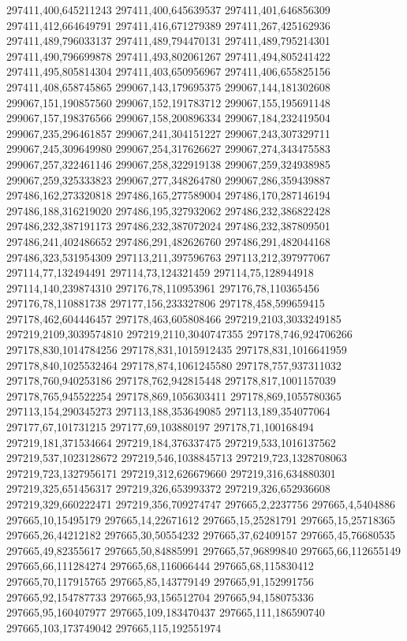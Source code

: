297411,400,645211243
297411,400,645639537
297411,401,646856309
297411,412,664649791
297411,416,671279389
297411,267,425162936
297411,489,796033137
297411,489,794470131
297411,489,795214301
297411,490,796699878
297411,493,802061267
297411,494,805241422
297411,495,805814304
297411,403,650956967
297411,406,655825156
297411,408,658745865
299067,143,179695375
299067,144,181302608
299067,151,190857560
299067,152,191783712
299067,155,195691148
299067,157,198376566
299067,158,200896334
299067,184,232419504
299067,235,296461857
299067,241,304151227
299067,243,307329711
299067,245,309649980
299067,254,317626627
299067,274,343475583
299067,257,322461146
299067,258,322919138
299067,259,324938985
299067,259,325333823
299067,277,348264780
299067,286,359439887
297486,162,273320818
297486,165,277589004
297486,170,287146194
297486,188,316219020
297486,195,327932062
297486,232,386822428
297486,232,387191173
297486,232,387072024
297486,232,387809501
297486,241,402486652
297486,291,482626760
297486,291,482044168
297486,323,531954309
297113,211,397596763
297113,212,397977067
297114,77,132494491
297114,73,124321459
297114,75,128944918
297114,140,239874310
297176,78,110953961
297176,78,110365456
297176,78,110881738
297177,156,233327806
297178,458,599659415
297178,462,604446457
297178,463,605808466
297219,2103,3033249185
297219,2109,3039574810
297219,2110,3040747355
297178,746,924706266
297178,830,1014784256
297178,831,1015912435
297178,831,1016641959
297178,840,1025532464
297178,874,1061245580
297178,757,937311032
297178,760,940253186
297178,762,942815448
297178,817,1001157039
297178,765,945522254
297178,869,1056303411
297178,869,1055780365
297113,154,290345273
297113,188,353649085
297113,189,354077064
297177,67,101731215
297177,69,103880197
297178,71,100168494
297219,181,371534664
297219,184,376337475
297219,533,1016137562
297219,537,1023128672
297219,546,1038845713
297219,723,1328708063
297219,723,1327956171
297219,312,626679660
297219,316,634880301
297219,325,651456317
297219,326,653993372
297219,326,652936608
297219,329,660222471
297219,356,709274747
297665,2,2237756
297665,4,5404886
297665,10,15495179
297665,14,22671612
297665,15,25281791
297665,15,25718365
297665,26,44212182
297665,30,50554232
297665,37,62409157
297665,45,76680535
297665,49,82355617
297665,50,84885991
297665,57,96899840
297665,66,112655149
297665,66,111284274
297665,68,116066444
297665,68,115830412
297665,70,117915765
297665,85,143779149
297665,91,152991756
297665,92,154787733
297665,93,156512704
297665,94,158075336
297665,95,160407977
297665,109,183470437
297665,111,186590740
297665,103,173749042
297665,115,192551974

